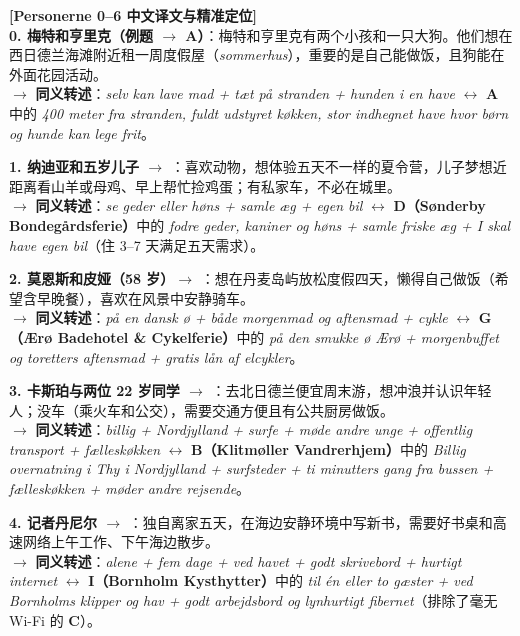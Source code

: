 \begin{transbox}
\small
\textbf{\color{NCDTeal}[Personerne 0--6 中文译文与精准定位]}\\
\textbf{0. 梅特和亨里克（例题 $\rightarrow$ A）}：梅特和亨里克有两个小孩和一只大狗。他们想在西日德兰海滩附近租一周度假屋（\textit{sommerhus}），重要的是自己能做饭，且狗能在外面花园活动。\\
$\rightarrow$ \textbf{同义转述}：\textit{selv kan lave mad + tæt på stranden + hunden i en have} $\leftrightarrow$ \textbf{A} 中的 \textit{400 meter fra stranden, fuldt udstyret køkken, stor indhegnet have hvor børn og hunde kan lege frit}。

\textbf{1. 纳迪亚和五岁儿子 $\rightarrow$ }：喜欢动物，想体验五天不一样的夏令营，儿子梦想近距离看山羊或母鸡、早上帮忙捡鸡蛋；有私家车，不必在城里。\\
$\rightarrow$ \textbf{同义转述}：\textit{se geder eller høns + samle æg + egen bil} $\leftrightarrow$ \textbf{D（Sønderby Bondegårdsferie）}中的 \textit{fodre geder, kaniner og høns + samle friske æg + I skal have egen bil}（住 3--7 天满足五天需求）。

\textbf{2. 莫恩斯和皮娅（58 岁）$\rightarrow$ }：想在丹麦岛屿放松度假四天，懒得自己做饭（希望含早晚餐），喜欢在风景中安静骑车。\\
$\rightarrow$ \textbf{同义转述}：\textit{på en dansk ø + både morgenmad og aftensmad + cykle} $\leftrightarrow$ \textbf{G（Ærø Badehotel \& Cykelferie）}中的 \textit{på den smukke ø Ærø + morgenbuffet og toretters aftensmad + gratis lån af elcykler}。

\textbf{3. 卡斯珀与两位 22 岁同学 $\rightarrow$ }：去北日德兰便宜周末游，想冲浪并认识年轻人；没车（乘火车和公交），需要交通方便且有公共厨房做饭。\\
$\rightarrow$ \textbf{同义转述}：\textit{billig + Nordjylland + surfe + møde andre unge + offentlig transport + fælleskøkken} $\leftrightarrow$ \textbf{B（Klitmøller Vandrerhjem）}中的 \textit{Billig overnatning i Thy i Nordjylland + surfsteder + ti minutters gang fra bussen + fælleskøkken + møder andre rejsende}。

\textbf{4. 记者丹尼尔 $\rightarrow$ }：独自离家五天，在海边安静环境中写新书，需要好书桌和高速网络上午工作、下午海边散步。\\
$\rightarrow$ \textbf{同义转述}：\textit{alene + fem dage + ved havet + godt skrivebord + hurtigt internet} $\leftrightarrow$ \textbf{I（Bornholm Kysthytter）}中的 \textit{til én eller to gæster + ved Bornholms klipper og hav + godt arbejdsbord og lynhurtigt fibernet}（排除了毫无 Wi-Fi 的 \textbf{C}）。


\end{transbox}

